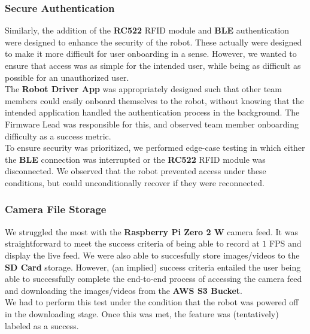 \documentclass{article}
\begin{document}
\subsubsection{Secure Authentication}

\begin{minipage}{\linewidth}
    Similarly, the addition of the \textbf{RC522} RFID module and \textbf{BLE} authentication were designed to enhance the security of the robot.
    These actually were designed to make it more difficult for user onboarding in a sense. However, we wanted to ensure that access was as simple for the
    intended user, while being as difficult as possible for an unauthorized user. \\

    The \textbf{Robot Driver App} was appropriately designed such that other team members could easily onboard themselves to the robot, without knowing
    that the intended application handled the authentication process in the background. The Firmware Lead was responsible for this,
    and observed team member onboarding difficulty as a success metric. \\

    To ensure security was prioritized, we performed edge-case testing in which either the \textbf{BLE} connection was interrupted or the
    \textbf{RC522} RFID module was disconnected. We observed that the robot prevented access under these conditions, but could unconditionally recover
    if they were reconnected. \\
\end{minipage}

\subsubsection{Camera File Storage}

\begin{minipage}{\linewidth}
    We struggled the most with the \textbf{Raspberry Pi Zero 2 W} camera feed. It was straightforward to meet the success criteria of being able to record at $1$ FPS and display the live feed.
    We were also able to succesfully store images/videos to the \textbf{SD Card} storage. However,
    (an implied) success criteria entailed the user being able to successfully complete the end-to-end process of accessing the camera feed and downloading the images/videos from the \textbf{AWS S3 Bucket}. \\

    We had to perform this test under the condition that the robot was powered off in the downloading stage. Once this was met, the feature was (tentatively) labeled as a success. \\
\end{minipage}
\end{document}
